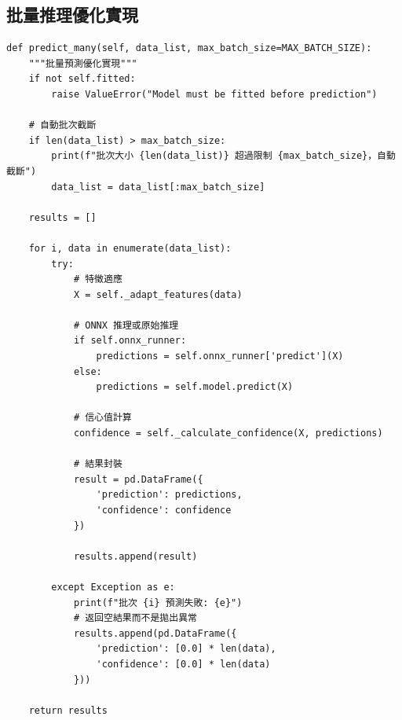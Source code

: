 \documentclass[11pt,a4paper]{article}
\begin{document}
\subsection{批量推理優化實現}

\begin{lstlisting}[caption=批量推理優化實現]
def predict_many(self, data_list, max_batch_size=MAX_BATCH_SIZE):
    """批量預測優化實現"""
    if not self.fitted:
        raise ValueError("Model must be fitted before prediction")
    
    # 自動批次截斷
    if len(data_list) > max_batch_size:
        print(f"批次大小 {len(data_list)} 超過限制 {max_batch_size}，自動截斷")
        data_list = data_list[:max_batch_size]
    
    results = []
    
    for i, data in enumerate(data_list):
        try:
            # 特徵適應
            X = self._adapt_features(data)
            
            # ONNX 推理或原始推理
            if self.onnx_runner:
                predictions = self.onnx_runner['predict'](X)
            else:
                predictions = self.model.predict(X)
            
            # 信心值計算
            confidence = self._calculate_confidence(X, predictions)
            
            # 結果封裝
            result = pd.DataFrame({
                'prediction': predictions,
                'confidence': confidence
            })
            
            results.append(result)
            
        except Exception as e:
            print(f"批次 {i} 預測失敗: {e}")
            # 返回空結果而不是拋出異常
            results.append(pd.DataFrame({
                'prediction': [0.0] * len(data),
                'confidence': [0.0] * len(data)
            }))
    
    return results
\end{lstlisting}
\end{document}
